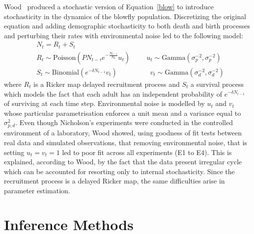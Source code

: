 \documentclass[12pt]{article}
\begin{document}
	Wood~\cite{wood2010statistical} produced a stochastic version of Equation~\ref{blow} to introduce stochasticity in the dynamics of the blowfly population. Discretizing the original equation and adding demographic stochasticity to both death and birth processes and perturbing their rates with environmental noise led to the following model:
	\begin{align}
	& N_t = R_t + S_t \\
	& R_t \sim  \mathrm{Poisson}(PN_{t-\tau}e^{-\frac{N_{t-\tau}}{N_0}}u_t)  \hspace{1cm} u_t \sim \mathrm{Gamma}(\sigma_p^{-2}, \sigma_p^{-2})\\ 
	& S_t \sim \mathrm{Binomial}(e^{-\delta N_{t-1}}v_t) \hspace{2cm}  v_t \sim \mathrm{Gamma}(\sigma_d^{-2}, \sigma_d^{-2}) 
	\end{align}
	where $R_t$ is a Ricker map delayed recruitment process and $S_t$ a survival process which models the fact that each adult has
	an independent probability of $e^{-\delta N_{t-1}}$ of surviving at each time step. Environmental noise is modelled by $u_t$ and $v_t$ whose particular parametrisation enforces a unit mean and a variance equal to $\sigma_{p,d}^2$. Even though Nicholson's experiments were conducted in the controlled environment of a laboratory, Wood showed, using goodness of fit tests between real data and simulated observations, that removing environmental noise, that is setting $u_t=v_t=1$ led to poor fit across all experiments (E1 to E4). This is explained, according to Wood, by the fact that the data present irregular cycle which can be accounted for resorting only to internal stochasticity. Since the recruitment process is a delayed Ricker map, the same difficulties arise in parameter estimation.  

	\section{Inference Methods}
\end{document}

